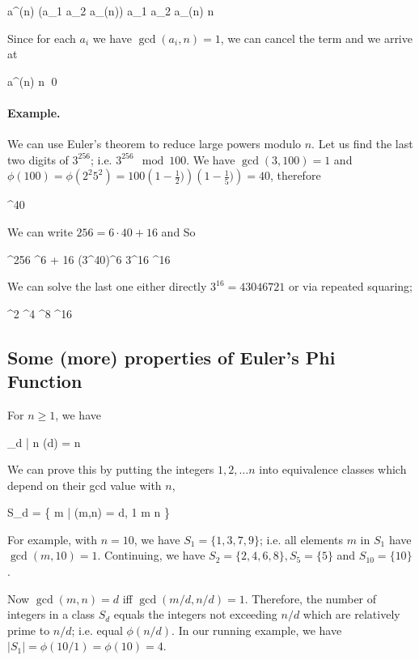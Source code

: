 \bee
a^{\phi(n)} (a_1 a_2 \cdots a_{\phi(n)}) \equiv a_1 a_2 \cdots a_{\phi(n)} \mod n
\eee

Since for each $a_i$ we have $\gcd(a_i,n) = 1$, we can cancel the term and we arrive at

\bee
a^{\phi(n)}  \mod n \qed
\eee

\paragraph{Example.} We can use Euler's theorem to reduce large powers modulo $n$. Let us find the last two digits of $3^{256}$; i.e. $3^{256} \mod 100$. We have $\gcd(3,100) = 1$ and $\phi(100) = \phi(2^2 5^2) = 100 \left(1 - \frac{1}{2})\right) \left(1 - \frac{1}{5})\right) = 40$, therefore

^{40}  
\eee

We can write $256 = 6 \cdot 40 + 16$ and So

^{256} ^{6  + 16} \equiv (3^{40})^6 3^{16} ^{16} 
\eee

We can solve the last one either directly $3^{16} = 43046721$ or via repeated squaring;

^2   ^4   ^8   ^{16}  
\eee

\subsection{Some (more) properties of Euler's Phi Function}

\begin{theorem}
  For $n \geq 1$, we have

  \bee
    \sum_{d | n} \phi(d) = n
  \eee

\end{theorem}

We can prove this by putting the integers $1, 2, \ldots n$ into equivalence classes which depend on their gcd value with $n$,

\bee
S_d = \{ m | \gcd(m,n) = d, 1 \leq m \leq n \}
\eee

For example, with $n=10$, we have $S_1 = \{1, 3, 7, 9\}$; i.e. all elements $m$ in $S_1$ have $\gcd(m,10)=1$. Continuing, we have $S_2 = \{2,4,6,8\}, S_5=\{5\}$ and $S_{10} = \{10\}$.

Now $\gcd(m,n) = d$ iff $\gcd(m/d, n/d) = 1$. Therefore, the number of integers in a class $S_d$ equals the integers not exceeding $n/d$ which are relatively prime to $n/d$; i.e. equal $\phi(n/d)$. In our running example, we have $|S_1| = \phi(10/1) = \phi(10) = 4$.

